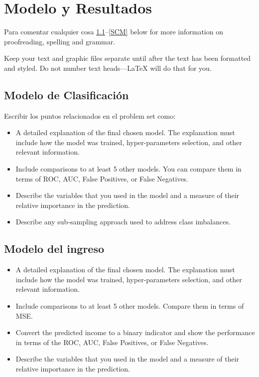 \documentclass[conference, 10pt]{IEEEtran}
\begin{document}
\section{Modelo y Resultados}
Para comentar cualquier cosa \ref{AA}--\ref{SCM} below for more information on 
proofreading, spelling and grammar.

Keep your text and graphic files separate until after the text has been 
formatted and styled. Do not number text heads---{\LaTeX} will do that 
for you.

\subsection{Modelo de Clasificación}\label{AA}
Escribir los puntos relacionados en el problem set como:

\begin{itemize}
\item A detailed explanation of the final chosen model. The explanation must include how the model was trained, hyper-parameters selection, and other relevant information.
\item Include comparisons to at least 5 other models. You can compare them in terms of ROC, AUC, False Positives, or False Negatives.
\item Describe the variables that you used in the model and a measure of their
relative importance in the prediction. 
\item Describe any sub-sampling approach used to address class imbalances.
\end{itemize}


\subsection{Modelo del ingreso}


\begin{itemize}
\item A detailed explanation of the final chosen model. The explanation must
include how the model was trained, hyper-parameters selection, and other
relevant information.
\item Include comparisons to at least 5 other models. Compare them in terms of
MSE.
\item Convert the predicted income to a binary indicator and show the performance in terms of the ROC, AUC, False Positives, or False Negatives.
\item Describe the variables that you used in the model and a measure of their relative importance in the prediction.
\end{itemize}
\end{document}
